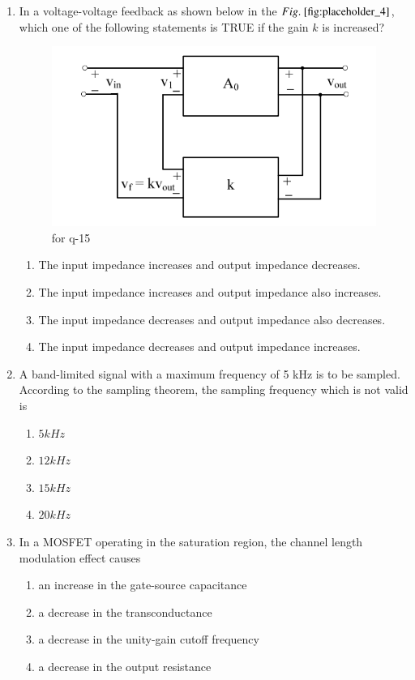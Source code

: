 \documentclass[journal,12pt,onecolumn]{IEEEtran}
\theoremstyle{remark}
\begin{document}
\begin{enumerate}
\item In a voltage-voltage feedback as shown below in the $\figref{fig:placeholder_4}$, which one of the following statements is TRUE if the gain $k$ is increased?
\begin{figure}[H]
    \centering
    \includegraphics[width=0.5\columnwidth]{figs/fig_4.png}
    \caption{\centering for q-15}
    \label{fig:placeholder_9}
\end{figure}
\begin{enumerate}
\item  The input impedance increases and output impedance decreases.
\item  The input impedance increases and output impedance also increases. 
\item  The input impedance decreases and output impedance also decreases. 
\item  The input impedance decreases and output impedance increases.
\end{enumerate}
\hfill {}

\item A band-limited signal with a maximum frequency of 5 kHz is to be sampled. According to the sampling theorem, the sampling frequency which is not valid is
\begin{multicols}{4}
\begin{enumerate}
\item $5 kHz$
\item $12 kHz$
\item $15 kHz$
\item $20 kHz$
\end{enumerate}
\end{multicols}
\hfill {}

\item In a MOSFET operating in the saturation region, the channel length modulation effect causes
\begin{enumerate}
\item an increase in the gate-source capacitance
\item a decrease in the transconductance
\item a decrease in the unity-gain cutoff frequency
\item a decrease in the output resistance
\end{enumerate}
\hfill {}


\end{enumerate}
\end{document}
